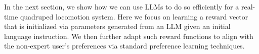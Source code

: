 In the next section, we show how we can use LLMs to do so efficiently for a real-time quadruped locomotion system. Here we focus on learning a reward vector that is initialized via parameters generated from an LLM given an initial language instruction. We then further adapt such reward functions to align with the non-expert user's preferences via standard preference learning techniques. 

